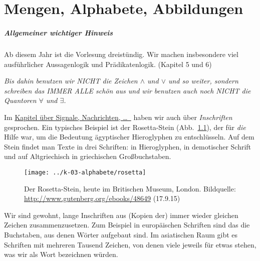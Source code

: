 \Tut\chapter{Mengen, Alphabete, Abbildungen}
\label{k:alphabete}

\begin{tutorium}
  \paragraph{Allgemeiner wichtiger Hinweis}

  Ab diesem Jahr ist die Vorlesung dreistündig. Wir machen
  insbesondere viel ausführlicher Aussagenlogik und Prädikatenlogik.
  (Kapitel 5 und 6)

  \emph{Bis dahin benutzen wir NICHT die Zeichen $\land$ und $\lor$
    und so weiter, sondern schreiben das IMMER ALLE schön aus und wir
    benutzen auch noch NICHT die Quantoren $\forall$ und $\exists$.}
\end{tutorium}
\begin{window}
\noindent Im \hyperref[k:signale]{Kapitel über Signale, Nachrichten, \dots\ \usw}
haben wir auch über \emph{Inschriften} gesprochen.
%
Ein typisches Beispiel ist der Rosetta-Stein (Abb.~\ref{abb:rosetta}),
der für %
 \emph{die} Hilfe war, um die
Bedeutung ägyptischer Hieroglyphen zu entschlüsseln.
%
Auf dem Stein findet man Texte in drei Schriften: in Hieroglyphen, in
demotischer Schrift und auf Altgriechisch in griechischen
Großbuchstaben.
\end{window}

\begin{figure}[h]
  \centering
  \texttt{[image: ../k-03-alphabete/rosetta]}
  \caption{Der Rosetta-Stein, heute im Britischen Museum,
    London. Bildquelle:
    \url{http://www.gutenberg.org/ebooks/48649} (17.9.15)}
  \label{abb:rosetta}
\end{figure}

Wir sind gewohnt, lange Inschriften aus (Kopien der) immer wieder
gleichen Zeichen zusammenzusetzen.
%
Zum Beispiel in europäischen Schriften sind das die Buchstaben, aus
denen Wörter aufgebaut sind.
%
Im asiatischen Raum gibt es Schriften mit mehreren Tausend Zeichen,
von denen viele jeweils für etwas stehen, was wir als Wort bezeichnen
würden.

